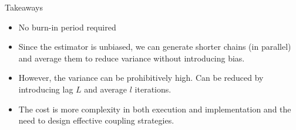 \begin{frame}{Takeaways}
	\begin{itemize}
		\item No burn-in period required
		\item Since the estimator is unbiased, we can generate shorter chains (in parallel) and average them to reduce variance without introducing bias.
		\item However, the variance can be prohibitively high. Can be reduced by introducing lag $L$ and average $l$ iterations.
		\item The cost is more complexity in both execution and implementation and the need to design effective coupling strategies.
	\end{itemize}
\end{frame}
